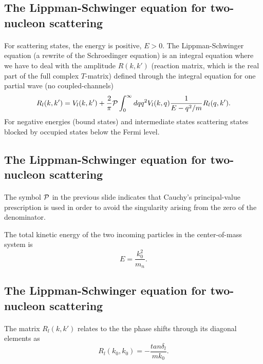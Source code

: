 \documentclass[%
twoside,                 %
final,                   %
10pt]{article}
\begin{document}
\subsection*{The Lippman-Schwinger equation for two-nucleon scattering}

\paragraph{}
For scattering states, the energy is positive, $E>0$. 
The Lippman-Schwinger equation (a rewrite of the Schroedinger equation)
is an integral equation
where we have to deal with the amplitude 
$R(k,k')$ (reaction matrix, which is the real part of  the full
complex $T$-matrix)
defined through the integral equation for one partial wave (no coupled-channels) 
\begin{equation}
    R_l(k,k') = V_l(k,k') +\frac{2}{\pi}{\cal P}
                \int_0^{\infty}dqq^2V_l(k,q)\frac{1}{E-q^2/m}R_l(q,k').
   \label{eq:ls1}
\end{equation}
For negative energies (bound states) and intermediate states scattering states blocked
by  occupied states below the Fermi level.



\subsection*{The Lippman-Schwinger equation for two-nucleon scattering}

\paragraph{}
The symbol ${\cal P}$ in the previous slide indicates that Cauchy's principal-value prescription
is used in order to avoid the singularity arising from the zero of the denominator.


The total kinetic energy of the two 
incoming particles in the center-of-mass system
is 
\[
    E=\frac{k_0^2}{m_n}.
\]



\subsection*{The Lippman-Schwinger equation for two-nucleon scattering}

\paragraph{}
The matrix $R_l(k,k')$ relates to the 
the  phase shifts through its diagonal elements as
\begin{equation}
     R_l(k_0,k_0)=-\frac{tan\delta_l}{mk_0}.
     \label{eq:shifts}
\end{equation}
\end{document}
